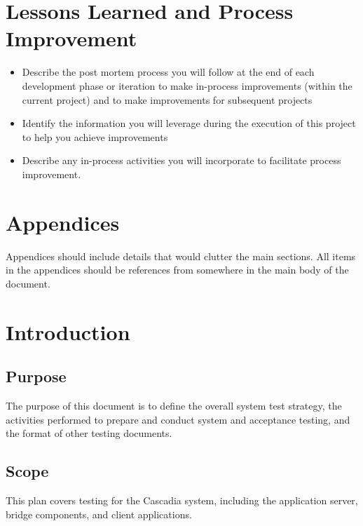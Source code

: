 \documentclass[11pt]{wacomepd}
\begin{document}
\chapter{Lessons Learned and Process Improvement}
\begin{itemize}
\item Describe the post mortem process you will follow at the end of each development phase or
  iteration to make in-process improvements (within the current project) and to make improvements
  for subsequent projects
\item Identify the information you will leverage during the execution of this project to help you
  achieve improvements
\item Describe any in-process activities you will incorporate to facilitate process improvement.
\end{itemize}



\chapter{Appendices}
Appendices should include details that would clutter the main sections.  All items in the appendices
should be references from somewhere in the main body of the document.


\chapter{Introduction}

\section{Purpose}


The purpose of this document is to define the overall system test strategy, the activities performed
to prepare and conduct system and acceptance testing, and the format of other testing documents.

\section{Scope}
This plan covers testing for the Cascadia system, including the application server, bridge
components, and client applications.
\end{document}
